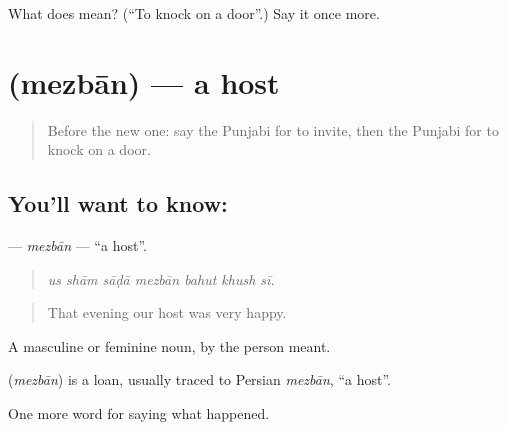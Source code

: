 \begin{tcolorbox}[breakable,colback=teal!4,colframe=teal!35!black,title={Before you move on}]
What does  mean? (\textquotedblleft{}To knock on a door\textquotedblright{}.) Say it once more.
\end{tcolorbox}
\section[\texorpdfstring{\pa{ਮੇਜ਼ਬਾਨ} (mezbān)}{ਮੇਜ਼ਬਾਨ (mezbān)}]{ (mezbān) — a host}

\label{lesson:PA-C312-mezban}



\begin{quote}
Before the new one: say the Punjabi for to invite, then the Punjabi for to knock on a door.
\end{quote}

\subsection*{You'll want to know: }
\textbf{} — \emph{mezbān} — \textquotedblleft{}a host\textquotedblright{}.

\begin{quote}
      
\end{quote}

\begin{quote}
\emph{us shām sāḍā mezbān bahut khush sī.}
\end{quote}

\begin{quote}
That evening our host was very happy.
\end{quote}

A masculine or feminine noun, by the person meant.

\begin{cousinweb}
\textbf{} (\emph{mezbān}) is a loan, usually traced to Persian \emph{mezbān}, \textquotedblleft{}a host\textquotedblright{}.
\end{cousinweb}

\begin{grammarlens}[title={What you've built}]
One more word for saying what happened.
\end{grammarlens}


